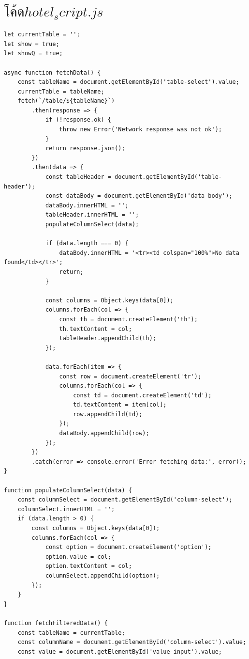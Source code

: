 \documentclass{report}
\begin{document}
\section{$โค้ดhotel_script.js$}
\begin{verbatim}
let currentTable = '';
let show = true;
let showQ = true;

async function fetchData() {
    const tableName = document.getElementById('table-select').value;
    currentTable = tableName;
    fetch(`/table/${tableName}`)
        .then(response => {
            if (!response.ok) {
                throw new Error('Network response was not ok');
            }
            return response.json();
        })
        .then(data => {
            const tableHeader = document.getElementById('table-header');
            const dataBody = document.getElementById('data-body');
            dataBody.innerHTML = '';
            tableHeader.innerHTML = '';
            populateColumnSelect(data);

            if (data.length === 0) {
                dataBody.innerHTML = '<tr><td colspan="100%">No data found</td></tr>';
                return;
            }

            const columns = Object.keys(data[0]);
            columns.forEach(col => {
                const th = document.createElement('th');
                th.textContent = col;
                tableHeader.appendChild(th);
            });

            data.forEach(item => {
                const row = document.createElement('tr');
                columns.forEach(col => {
                    const td = document.createElement('td');
                    td.textContent = item[col];
                    row.appendChild(td);
                });
                dataBody.appendChild(row);
            });
        })
        .catch(error => console.error('Error fetching data:', error));
}

function populateColumnSelect(data) {
    const columnSelect = document.getElementById('column-select');
    columnSelect.innerHTML = '';
    if (data.length > 0) {
        const columns = Object.keys(data[0]);
        columns.forEach(col => {
            const option = document.createElement('option');
            option.value = col;
            option.textContent = col;
            columnSelect.appendChild(option);
        });
    }
}

function fetchFilteredData() {
    const tableName = currentTable;
    const columnName = document.getElementById('column-select').value;
    const value = document.getElementById('value-input').value;


\end{verbatim}
\end{document}
